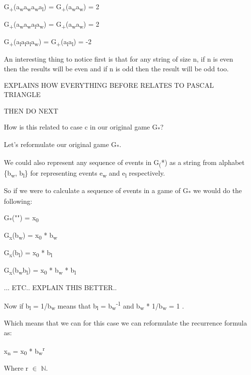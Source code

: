 \documentclass[12pt,reqno]{amsart}
\begin{document}
G\textsubscript{+}(a\textsubscript{w}a\textsubscript{w}a\textsubscript{w}a\textsubscript{l}) = G\textsubscript{+}(a\textsubscript{w}a\textsubscript{w}) =  2

G\textsubscript{+}(a\textsubscript{w}a\textsubscript{w}a\textsubscript{l}a\textsubscript{w}) = G\textsubscript{+}(a\textsubscript{w}a\textsubscript{w}) = 2

G\textsubscript{+}(a\textsubscript{l}a\textsubscript{l}a\textsubscript{l}a\textsubscript{w}) = G\textsubscript{+}(a\textsubscript{l}a\textsubscript{l}) = -2

An interesting thing to notice first is that for any string of size n, if n is even then the results will be even and if n is odd then the result will be odd too.

EXPLAINS HOW EVERYTHING BEFORE RELATES TO PASCAL TRIANGLE

THEN DO NEXT


How is this related to case c in our original game G\textsubscript{*}?


Let's reformulate our original game G\textsubscript{*}.

We could also represent any sequence of events in G\textsubscript(*) as a string from alphabet \{b\textsubscript{w}, b\textsubscript{l}\} for representing events e\textsubscript{w} and e\textsubscript{l} respectively.

So if we were to calculate a sequence of events in a game of G\textsubscript{*} we would do the following:

G\textsubscript{*}("") = x\textsubscript{0}

G\textsubscript{x}(b\textsubscript{w}) = x\textsubscript{0} * b\textsubscript{w}

G\textsubscript{x}(b\textsubscript{l}) = x\textsubscript{0} * b\textsubscript{l}

G\textsubscript{x}(b\textsubscript{w}b\textsubscript{l}) = x\textsubscript{0} * b\textsubscript{w} * b\textsubscript{l}

... ETC.. EXPLAIN THIS BETTER..

Now if b\textsubscript{l} = 1/b\textsubscript{w} means that b\textsubscript{l} = b\textsubscript{w}\textsuperscript{-1} and b\textsubscript{w} * 1/b\textsubscript{w} = 1 .

Which means that we can for this case we can reformulate the recurrence formula as:

x\textsubscript{n} = x\textsubscript{0} * b\textsubscript{w}\textsuperscript{r}

Where r $\in$ $\mathbb{N}$.  
\end{document}
